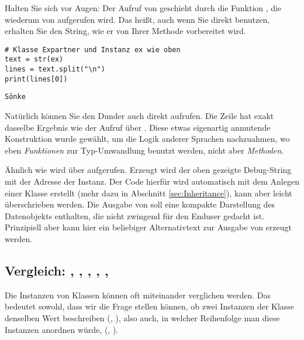 Halten Sie sich vor Augen: Der Aufruf von  geschieht durch die Funktion , die wiederum von  aufgerufen wird. Das heißt, auch wenn Sie direkt  benutzen, erhalten Sie den String, wie er von Ihrer Methode vorbereitet wird.

\begin{codebox}
\begin{verbatim}
# Klasse Expartner und Instanz ex wie oben
text = str(ex)
lines = text.split("\n")
print(lines[0])
\end{verbatim}
\end{codebox}
\begin{cmdbox}
\begin{verbatim}
Sönke
\end{verbatim}
\end{cmdbox}

Natürlich können Sie den Dunder auch direkt aufrufen. Die Zeile  hat exakt dasselbe Ergebnis wie der Aufruf über . Diese etwas eigenartig anmutende Konstruktion wurde gewählt, um die Logik anderer Sprachen nachzuahmen, wo eben \emph{Funktionen} zur Typ-Umwandlung benutzt werden, nicht aber \emph{Methoden}.

Ähnlich wie  wird  über  aufgerufen. Erzeugt wird der oben gezeigte Debug-String mit der Adresse der Instanz. Der Code hierfür wird automatisch mit dem Anlegen einer Klasse erstellt (mehr dazu in Abschnitt \ref{sec:Inheritance}), kann aber leicht überschrieben werden. Die Ausgabe von  soll eine kompakte Darstellung des Datenobjekts enthalten, die nicht zwingend für den Enduser gedacht ist. Prinzipiell aber kann hier ein beliebiger Alternativtext zur Ausgabe von  erzeugt werden.

\subsection{Vergleich: , , , , , }
Die Instanzen von Klassen können oft miteinander verglichen werden. Das bedeutet sowohl, dass wir die Frage stellen können, ob zwei Instanzen der Klasse denselben Wert beschreiben (, \eg {}), also auch, in welcher Reihenfolge man diese Instanzen anordnen würde, (, \eg {}).

